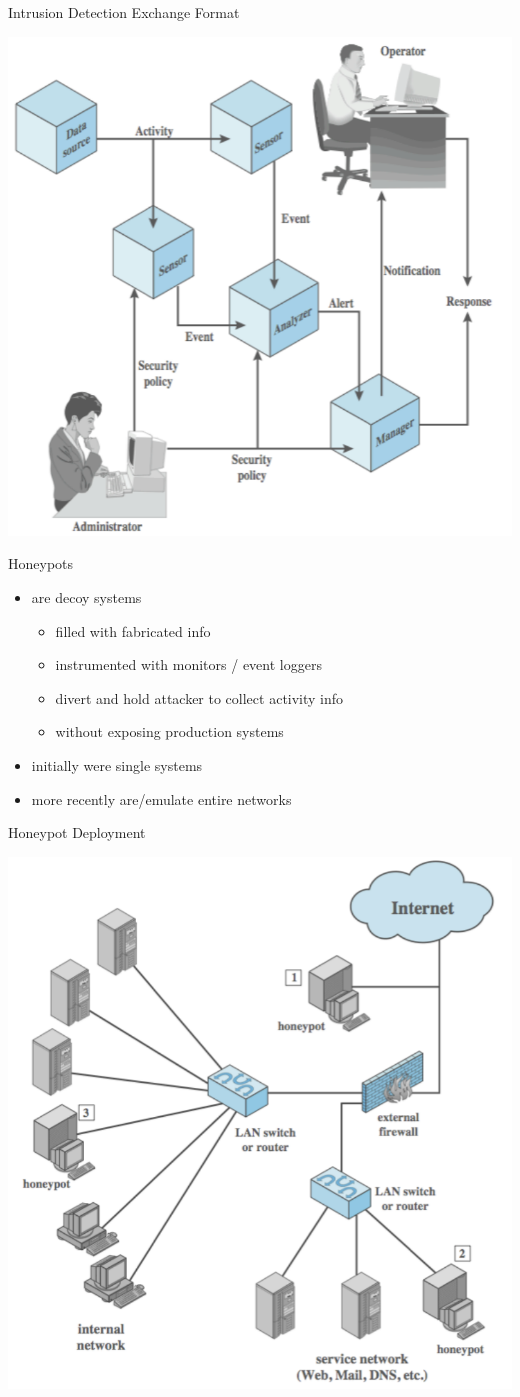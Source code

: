 \documentclass{beamer}
\begin{document}
\begin{frame}{Intrusion Detection Exchange Format}
   \begin{center}
    \includegraphics[width=0.6\linewidth]{ids-format}
  \end{center}
\end{frame}

\begin{frame}{Honeypots}
  \begin{itemize}
  \item are decoy systems 
    \begin{itemize}
    \item filled with fabricated info 
    \item instrumented with monitors / event loggers 
    \item divert and hold attacker to collect activity info 
    \item without exposing production systems 
    \end{itemize}
  \item initially were single systems 
  \item more recently are/emulate entire networks
  \end{itemize}
\end{frame}

\begin{frame}{Honeypot Deployment}
   \begin{center}
    \includegraphics[width=0.6\linewidth]{honeypot}
  \end{center}
\end{frame}
\end{document}
